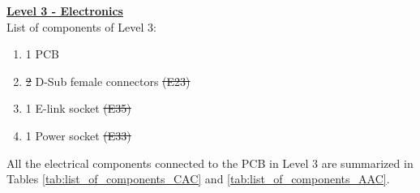 \documentclass[a4paper,12pt,oneside]{article} %
\providecommand{\DIFaddtex}[1]{{\protect\color{blue}\uwave{#1}}} %
\providecommand{\DIFdeltex}[1]{{\protect\color{red}\sout{#1}}}                      %
\providecommand{\DIFaddbegin}{} %
\providecommand{\DIFaddend}{} %
\providecommand{\DIFdelbegin}{} %
\providecommand{\DIFdelend}{} %
\providecommand{\DIFadd}[1]{\texorpdfstring{\DIFaddtex{#1}}{#1}} %
\providecommand{\DIFdel}[1]{\texorpdfstring{\DIFdeltex{#1}}{}} %
\newcommand{\DIFscaledelfig}{0.5}
\newlength{\DIFdelgraphicswidth} %
\newlength{\DIFdelgraphicsheight} %
\newcommand{\DIFaddincludegraphics}[2][]{{\color{blue}\fbox{\DIFOincludegraphics[#1]{#2}}}} %
\newcommand{\DIFdelincludegraphics}[2][]{%
\sbox{\DIFdelgraphicsbox}{\DIFOincludegraphics[#1]{#2}}%
\settoboxwidth{\DIFdelgraphicswidth}{\DIFdelgraphicsbox} %
\settoboxtotalheight{\DIFdelgraphicsheight}{\DIFdelgraphicsbox} %
\scalebox{\DIFscaledelfig}{%
\parbox[b]{\DIFdelgraphicswidth}{\usebox{\DIFdelgraphicsbox}\\[-\baselineskip] \rule{\DIFdelgraphicswidth}{0em}}\llap{\resizebox{\DIFdelgraphicswidth}{\DIFdelgraphicsheight}{%
\setlength{\unitlength}{\DIFdelgraphicswidth}%
\begin{picture}(1,1)%
\thicklines\linethickness{2pt} %
{\color[rgb]{1,0,0}\put(0,0){\framebox(1,1){}}}%
{\color[rgb]{1,0,0}\put(0,0){\line( 1,1){1}}}%
{\color[rgb]{1,0,0}\put(0,1){\line(1,-1){1}}}%
\end{picture}%
}\hspace*{3pt}}} %
} %
\DeclareRobustCommand{\DIFaddbegin}{\DIFOaddbegin \let\includegraphics\DIFaddincludegraphics} %
\DeclareRobustCommand{\DIFaddend}{\DIFOaddend \let\includegraphics\DIFOincludegraphics} %
\DeclareRobustCommand{\DIFdelbegin}{\DIFOdelbegin \let\includegraphics\DIFdelincludegraphics} %
\DeclareRobustCommand{\DIFdelend}{\DIFOaddend \let\includegraphics\DIFOincludegraphics} %
\begin{document}
\begin{appendices}
\textbf{\underline{Level 3 - Electronics}}
\\
List of components of Level 3:
\begin{enumerate}[label=\Alph*.]
    \item 1 PCB
    \item \DIFdelbegin \DIFdel{2 }\DIFdelend \DIFaddbegin \DIFadd{5 }\DIFaddend D-Sub female connectors
    \DIFdelbegin \DIFdel{(E23)
    }\DIFdelend \item 1 E-link socket
    \DIFdelbegin \DIFdel{(E35)
    }\DIFdelend \item 1 Power socket
\DIFdelbegin \DIFdel{(E33)
}\DIFdelend \end{enumerate}
\DIFdelbegin %
\DIFdelend All the electrical components connected to the PCB in Level 3 are summarized in Tables \ref{tab:list_of_components_CAC} and \ref{tab:list_of_components_AAC}. 
\begin{table}[H]
\centering


\end{table}
\end{appendices}
\end{document}
